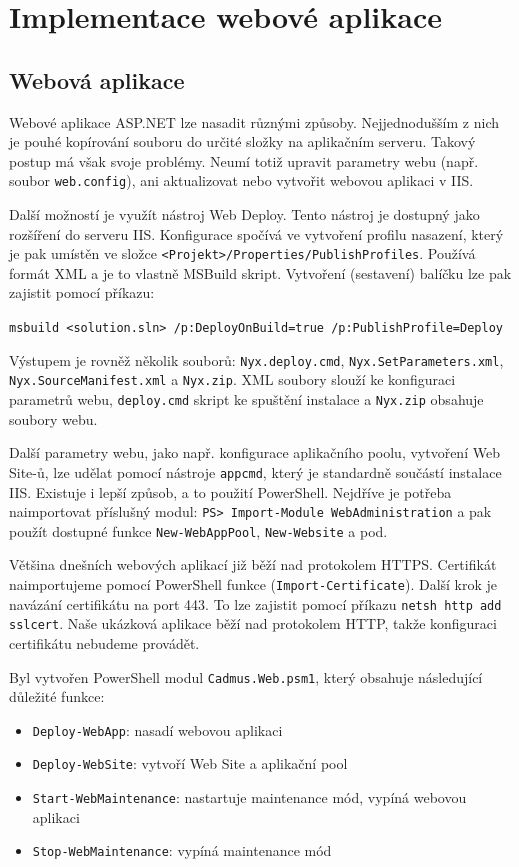\section{Implementace webové aplikace}

\subsection{Webová aplikace}
Webové aplikace ASP.NET lze nasadit různými způsoby. Nejjednodušším z nich je pouhé kopírování souboru do určité složky na aplikačním serveru. Takový postup má však svoje problémy. Neumí totiž upravit parametry webu (např. soubor \texttt{web.config}), ani aktualizovat nebo vytvořit webovou aplikaci v IIS. 

Další možností je využít nástroj Web Deploy. Tento nástroj je dostupný jako rozšíření do serveru IIS. Konfigurace spočívá ve vytvoření profilu nasazení, který je pak umístěn ve složce \texttt{<Projekt>/Properties/PublishProfiles}. Používá formát XML a je to vlastně MSBuild skript. Vytvoření (sestavení) balíčku lze pak zajistit pomocí příkazu:

\texttt{msbuild <solution.sln> /p:DeployOnBuild=true /p:PublishProfile=Deploy}

Výstupem je rovněž několik souborů: \texttt{Nyx.deploy.cmd}, \texttt{Nyx.SetParameters.xml},\\ \texttt{Nyx.SourceManifest.xml} a \texttt{Nyx.zip}. XML soubory slouží ke konfiguraci parametrů webu, \texttt{deploy.cmd} skript ke spuštění instalace a \texttt{Nyx.zip} obsahuje soubory webu.

Další parametry webu, jako např. konfigurace aplikačního poolu, vytvoření Web Site-ů, lze udělat pomocí nástroje \texttt{appcmd}, který je standardně součástí instalace IIS. Existuje i lepší způsob, a to použití PowerShell. Nejdříve je potřeba naimportovat příslušný modul: \texttt{PS> Import-Module WebAdministration} a pak použít dostupné funkce \texttt{New-WebAppPool}, \texttt{New-Website} a pod.

Většina dnešních webových aplikací již běží nad protokolem HTTPS. Certifikát naimportujeme pomocí PowerShell funkce (\texttt{Import-Certificate}). Další krok je navázání certifikátu na port 443. To lze zajistit pomocí příkazu \texttt{netsh http add sslcert}. Naše ukázková aplikace běží nad protokolem HTTP, takže konfiguraci certifikátu nebudeme provádět.

Byl vytvořen PowerShell modul \texttt{Cadmus.Web.psm1}, který obsahuje následující důležité funkce:
\begin{itemize}
\item \texttt{Deploy-WebApp}: nasadí webovou aplikaci
\item \texttt{Deploy-WebSite}: vytvoří Web Site a aplikační pool
\item \texttt{Start-WebMaintenance}: nastartuje maintenance mód, vypíná webovou aplikaci
\item \texttt{Stop-WebMaintenance}: vypíná maintenance mód
\end{itemize}

